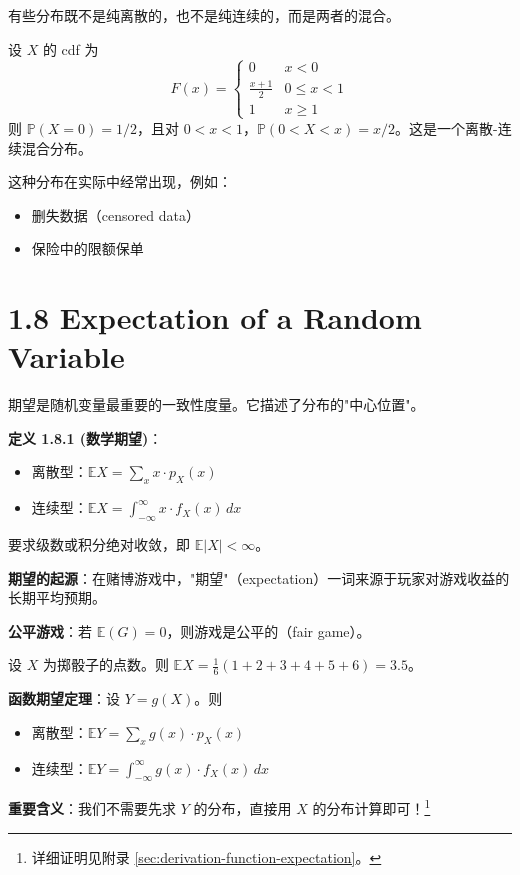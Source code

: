 有些分布既不是纯离散的，也不是纯连续的，而是两者的混合。

\begin{example}[混合分布]\label{ex:mixed-dist-ch1}
设 $X$ 的 cdf 为
\[
F(x) = \begin{cases} 0 & x < 0 \\ \frac{x+1}{2} & 0 \leq x < 1 \\ 1 & x \geq 1 \end{cases}
\]
则 $\mathbb{P}(X = 0) = 1/2$，且对 $0 < x < 1$，$\mathbb{P}(0 < X < x) = x/2$。这是一个离散-连续混合分布。

这种分布在实际中经常出现，例如：
\begin{itemize}
    \item 删失数据（censored data）
    \item 保险中的限额保单
\end{itemize}
\end{example}

\section{1.8 Expectation of a Random Variable}\label{sec:1.8}

期望是随机变量最重要的一致性度量。它描述了分布的"中心位置"。

\begin{remark}
\textbf{定义 1.8.1 (数学期望)}：
\begin{itemize}
    \item 离散型：$\displaystyle \mathbb{E}X = \sum_x x \cdot p_X(x)$
    \item 连续型：$\displaystyle \mathbb{E}X = \int_{-\infty}^{\infty} x \cdot f_X(x) \, dx$
\end{itemize}
要求级数或积分绝对收敛，即 $\mathbb{E}|X| < \infty$。
\end{remark}

\textbf{期望的起源}：在赌博游戏中，"期望"（expectation）一词来源于玩家对游戏收益的长期平均预期。

\textbf{公平游戏}：若 $\mathbb{E}(G) = 0$，则游戏是公平的（fair game）。

\begin{example}[骰子期望]\label{ex:dice-expectation-ch1}
设 $X$ 为掷骰子的点数。则 $\mathbb{E}X = \frac{1}{6}(1+2+3+4+5+6) = 3.5$。
\end{example}

\begin{remark}
\textbf{函数期望定理}：设 $Y = g(X)$。则
\begin{itemize}
    \item 离散型：$\displaystyle \mathbb{E}Y = \sum_x g(x) \cdot p_X(x)$
    \item 连续型：$\displaystyle \mathbb{E}Y = \int_{-\infty}^{\infty} g(x) \cdot f_X(x) \, dx$
\end{itemize}

\textbf{重要含义}：我们不需要先求 $Y$ 的分布，直接用 $X$ 的分布计算即可！\footnote{详细证明见附录 \cref{sec:derivation-function-expectation}。}
\end{remark}

